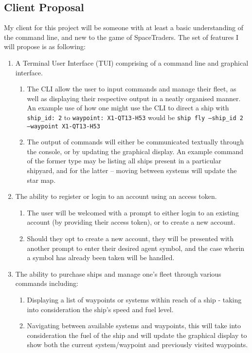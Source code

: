 \subsection{Client Proposal}
My client for this project will be someone with at least a basic understanding of the command line, and new to the game of SpaceTraders. The set of features I will propose is as following:
\begin{enumerate}
    \item A Terminal User Interface (TUI) comprising of a command line and graphical interface.
        \begin{enumerate}
            \item The CLI allow the user to input commands and manage their fleet, as well as displaying their respective output in a neatly organised manner. An example use of how one might use the CLI to direct a ship with \texttt{ship\_id: 2} to \texttt{waypoint: X1-QT13-H53} would be \texttt{ship fly --ship\_id 2 --waypoint X1-QT13-H53}
            \item The output of commands will either be communicated textually through the console, or by updating the graphical display. An example command of the former type may be listing all ships present in a particular shipyard, and for the latter – moving between systems will update the star map.
        \end{enumerate}
    \item The ability to register or login to an account using an access token.
        \begin{enumerate}
            \item The user will be welcomed with a prompt to either login to an existing account (by providing their access token), or to create a new account.
            \item Should they opt to create a new account, they will be presented with another prompt to enter their desired agent symbol, and the case wherin a symbol has already been taken will be handled.
        \end{enumerate}
    \item The ability to purchase ships and manage one's fleet through various commands including:
        \begin{enumerate}
            \item Displaying a list of waypoints or systems within reach of a ship - taking into consideration the ship's speed and fuel level.
            \item Navigating between available systems and waypoints, this will take into consideration the fuel of the ship and will update the graphical display to show both the current system/waypoint and previously visited waypoints.

\end{enumerate}
\end{enumerate}
